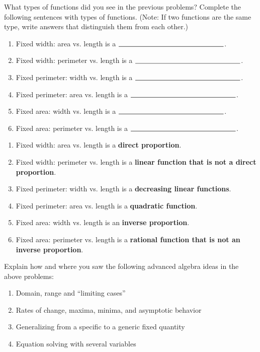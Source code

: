 \begin{prob}
What types of functions did you see in the previous problems?  Complete the following sentences with types of functions.  (Note:  If two functions are the same type, write answers that distinguish them from each other.)  
\begin{enumerate}
\item Fixed width: area vs. length is a $\rule[-1pt]{150pt}{.5pt}$.
\item Fixed width: perimeter vs. length is a $\rule[-1pt]{150pt}{.5pt}$.
\item Fixed perimeter: width vs. length is a $\rule[-1pt]{150pt}{.5pt}$.
\item Fixed perimeter: area vs. length is a $\rule[-1pt]{150pt}{.5pt}$.
\item Fixed area: width vs. length is a $\rule[-1pt]{150pt}{.5pt}$.
\item Fixed area: perimeter vs. length is a $\rule[-1pt]{150pt}{.5pt}$.
\end{enumerate}
\end{prob}

\begin{teachingnote}
\begin{enumerate}
\item Fixed width: area vs. length is a \textbf{direct proportion}.  
\item Fixed width: perimeter vs. length is a \textbf{linear function that is not a direct proportion}. 
\item Fixed perimeter: width vs. length is a \textbf{decreasing linear functions}. 
\item Fixed perimeter: area vs. length is a \textbf{quadratic function}. 
\item Fixed area: width vs. length is an \textbf{inverse proportion}.  
\item Fixed area: perimeter vs. length is a \textbf{rational function that is not an inverse proportion}. 
\end{enumerate}
\end{teachingnote}

\begin{prob}
Explain how and where you saw the following advanced algebra ideas in the above problems:  
\begin{enumerate}
\item Domain, range and ``limiting cases''
\item Rates of change, maxima, minima, and asymptotic behavior
\item Generalizing from a specific to a generic fixed quantity
\item Equation solving with several variables
\end{enumerate}
\end{prob}
